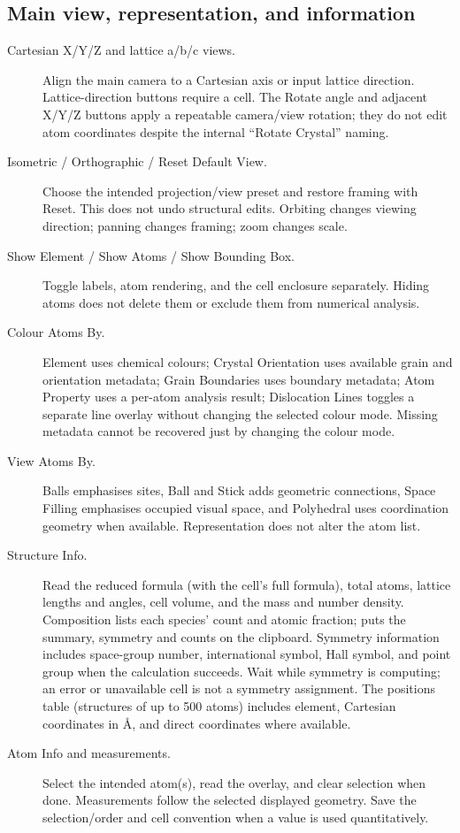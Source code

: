 \subsection{Main view, representation, and information}
\begin{description}
\item[Cartesian X/Y/Z and lattice a/b/c views.] Align the main camera to a Cartesian axis or input lattice direction. Lattice-direction buttons require a cell. The Rotate angle and adjacent X/Y/Z buttons apply a repeatable camera/view rotation; they do not edit atom coordinates despite the internal ``Rotate Crystal'' naming.
\item[Isometric / Orthographic / Reset Default View.] Choose the intended projection/view preset and restore framing with Reset. This does not undo structural edits. Orbiting changes viewing direction; panning changes framing; zoom changes scale.
\item[Show Element / Show Atoms / Show Bounding Box.] Toggle labels, atom rendering, and the cell enclosure separately. Hiding atoms does not delete them or exclude them from numerical analysis.
\item[Colour Atoms By.] Element uses chemical colours; Crystal Orientation uses available grain and orientation metadata; Grain Boundaries uses boundary metadata; Atom Property uses a per-atom analysis result; Dislocation Lines toggles a separate line overlay without changing the selected colour mode. Missing metadata cannot be recovered just by changing the colour mode.
\item[View Atoms By.] Balls emphasises sites, Ball and Stick adds geometric connections, Space Filling emphasises occupied visual space, and Polyhedral uses coordination geometry when available. Representation does not alter the atom list.
\item[Structure Info.] Read the reduced formula (with the cell's full formula), total atoms, lattice lengths and angles, cell volume, and the mass and number density. Composition lists each species' count and atomic fraction;  puts the summary, symmetry and counts on the clipboard. Symmetry information includes space-group number, international symbol, Hall symbol, and point group when the calculation succeeds. Wait while symmetry is computing; an error or unavailable cell is not a symmetry assignment. The positions table (structures of up to 500 atoms) includes element, Cartesian coordinates in \AA{}, and direct coordinates where available.
\item[Atom Info and measurements.] Select the intended atom(s), read the overlay, and clear selection when done. Measurements follow the selected displayed geometry. Save the selection/order and cell convention when a value is used quantitatively.

\end{description}
